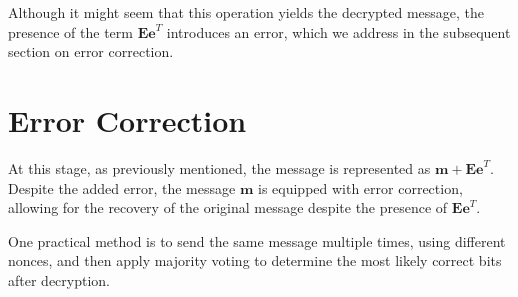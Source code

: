 Although it might seem that this operation yields the decrypted message, the presence of the term $\mathbf{Ee}^T$ introduces an error, which we address in the subsequent section on error correction.

\section{Error Correction}
At this stage, as previously mentioned, the message is represented as $\mathbf{m} + \mathbf{Ee}^T$. Despite the added error, the message $\mathbf{m}$ is equipped with error correction, allowing for the recovery of the original message despite the presence of $\mathbf{Ee}^T$.

One practical method is to send the same message multiple times, using different nonces, and then apply majority voting to determine the most likely correct bits after decryption.
